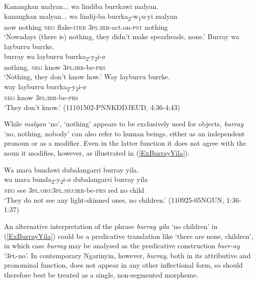 \documentclass[output=paper,colorlinks,citecolor=brown]{langscibook}
\begin{document}
\begin{exe}
\ex \label{Ex11101502-PNNKDDJEUDNeg}
\begin{xlist}[PN:]
    \glll Kanangkan malyan... wa lindiba burrkawi malyan.\\
    kanangkan malyan... wa lindij-ba burrka\textsubscript{2}-w\textsubscript{1}u-yi malyan\\
    now nothing \textsc{neg} flake-\textsc{iter} 3\textsc{pl}:\textsc{irr}-act.on-\textsc{pst} nothing\\
    \trans `Nowadays (there is) nothing, they didn't make spearheads, none.'
    \glll Burray wa layburru burrke.\\
    burray wa layburru burrka\textsubscript{2}-y\textsubscript{2}i-{\o}\\
    nothing, \textsc{neg} know 3\textsc{pl}:\textsc{irr}-be-\textsc{prs}\\
    \trans `Nothing, they don't know how.'
    \glll Way layburru burrke.\\
    way layburru burrka\textsubscript{2}-y\textsubscript{2}i-{\o}\\
    \textsc{neg} know 3\textsc{pl}:\textsc{irr}-be-\textsc{prs}\\
    \trans `They don't know.' (11101502-PNNKDDJEUD, 4:36-4:43)
\end{xlist}
\end{exe}

While \textit{malyan} `no', `nothing' appears to be exclusively used for objects, \textit{burray} `no, nothing, nobody' can also refer to human beings, either as an independent pronoun or as a modifier. Even in the latter function it does not agree with the noun it modifies, however, as illustrated in (\ref{ExBurrayYila}).

\begin{exe}
\ex \label{ExBurrayYila}
    \glll Wa mara bundawi dubalangarri burray yila.\\
    wa mara bunda\textsubscript{2}-y\textsubscript{2}i-{\o} dubalangarri burray yila\\
    \textsc{neg} see \textsc{3pl.obj:3pl.sbj:irr}-be-\textsc{prs} red no child\\
    \trans `They do not see any light-skinned ones, no children.' (110925-05NGUN, 1:36-1:37)
\end{exe}

An alternative interpretation of the phrase \textit{burray yila} `no children' in (\ref{ExBurrayYila}) could be a predicative translation like `there are none, children', in which case \textit{burray} may be analysed as the predicative construction \textit{burr-ay} `3\textsc{pl}-no'. In contemporary Ngarinyin, however, \textit{burray}, both in its attributive and pronominal function, does not appear in any other inflectional form, so should therefore best be treated as a single, non-segmented morpheme.
\end{document}
